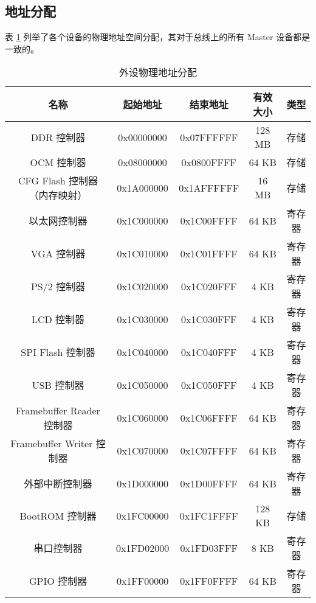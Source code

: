 \subsection{地址分配}

表 \ref{table:address_allocation} 列举了各个设备的物理地址空间分配，其对于总线上的所有 Master 设备都是一致的。

\begin{table}[!htbp]
    \centering
    \caption{外设物理地址分配}
    \label{table:address_allocation}
    \begin{tabular}{|c|c|c|c|c|}
    \hline
    \textbf{名称} & \textbf{起始地址} & \textbf{结束地址} & \textbf{有效大小} & \textbf{类型} \\ \hline
    DDR 控制器        & 0x00000000    & 0x07FFFFFF    & 128 MB          & 存储          \\ \hline
    OCM 控制器       & 0x08000000    & 0x0800FFFF    & 64 KB          & 存储          \\ \hline
    CFG Flash 控制器（内存映射） & 0x1A000000    & 0x1AFFFFFF    & 16 MB          & 存储          \\ \hline
    以太网控制器    & 0x1C000000    & 0x1C00FFFF    & 64 KB      & 寄存器          \\ \hline
    VGA 控制器        & 0x1C010000    & 0x1C01FFFF    & 64 KB         & 寄存器         \\ \hline
    PS/2 控制器        & 0x1C020000    & 0x1C020FFF    & 4 KB         & 寄存器         \\ \hline
    LCD 控制器        & 0x1C030000    & 0x1C030FFF    & 4 KB         & 寄存器         \\ \hline
    SPI Flash 控制器        & 0x1C040000    & 0x1C040FFF    & 4 KB         & 寄存器         \\ \hline
    USB 控制器        & 0x1C050000    & 0x1C050FFF    & 4 KB         & 寄存器         \\ \hline
    Framebuffer Reader 控制器        & 0x1C060000    & 0x1C06FFFF    & 64 KB         & 寄存器         \\ \hline
    Framebuffer Writer 控制器        & 0x1C070000    & 0x1C07FFFF    & 64 KB         & 寄存器         \\ \hline
    外部中断控制器        & 0x1D000000    & 0x1D00FFFF    & 64 KB         & 寄存器         \\ \hline
    BootROM 控制器       & 0x1FC00000    & 0x1FC1FFFF    & 128 KB          & 存储          \\ \hline
    串口控制器       & 0x1FD02000    & 0x1FD03FFF    & 8 KB          & 寄存器          \\ \hline
    GPIO 控制器       & 0x1FF00000    & 0x1FF0FFFF    & 64 KB          & 寄存器          \\ \hline

    \end{tabular}
\end{table}

